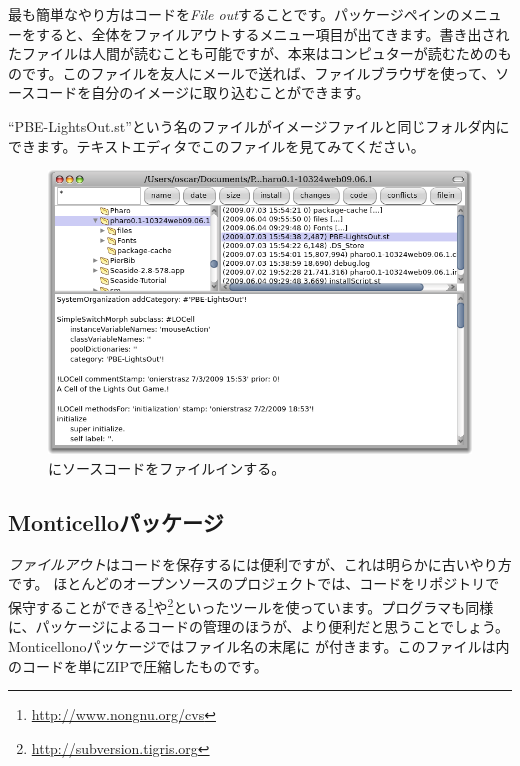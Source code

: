 \documentclass[a4paper,10pt,twoside]{book}
\begin{document}
最も簡単なやり方はコードを\emph{File out}することです。パッケージペインのメニューを\actclick すると、全体をファイルアウトするメニュー項目が出てきます。書き出されたファイルは人間が読むことも可能ですが、本来はコンピュターが読むためのものです。このファイルを友人にメールで送れば、ファイルブラウザを使って、ソースコードを自分の\pharo イメージに取り込むことができます。


``PBE-LightsOut.st''という名のファイルがイメージファイルと同じフォルダ内にできます。テキストエディタでこのファイルを見てみてください。


\begin{figure}[ht]
\centerline {\includegraphics[width=\textwidth]{FileIn}}
\caption{\pharo にソースコードをファイルインする。
}
\end{figure}

\subsection{Monticelloパッケージ}
\emph{ファイルアウト}はコードを保存するには便利ですが、これは明らかに古いやり方です。
ほとんどのオープンソースのプロジェクトでは、コードをリポジトリで保守することができる\footnote{\url{http://www.nongnu.org/cvs}}や\footnote{\url{http://subversion.tigris.org}}といったツールを使っています。\pharo プログラマも同様に、パッケージによるコードの管理のほうが、より便利だと思うことでしょう。Monticellonoパッケージではファイル名の末尾に が付きます。このファイルは内のコードを単にZIPで圧縮したものです。
\end{document}
